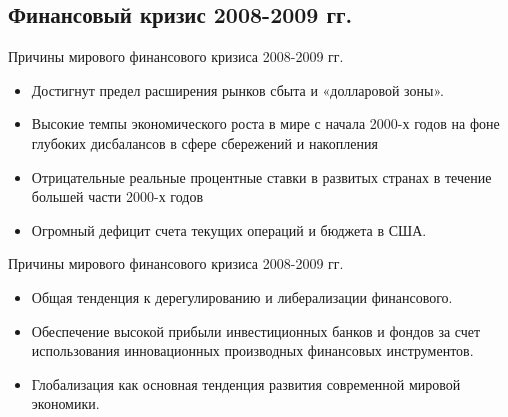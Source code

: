 \documentclass[_Banking_p1.tex]{subfiles}
\begin{document}
\subsection{Финансовый кризис 2008-2009 гг.}
\begin{frame}{\setfontsize{12pt} Причины мирового финансового кризиса 2008-2009 гг.}
\begin{itemize}[<+->]
\item
Достигнут предел расширения рынков сбыта и «долларовой зоны». 

\item
Высокие темпы экономического роста в мире с начала 2000-х годов на фоне глубоких дисбалансов в сфере  сбережений и накопления

\item
Отрицательные реальные процентные ставки в развитых странах в течение большей части 2000-х годов

\item
Огромный дефицит счета текущих операций и бюджета в США.
\end{itemize}

\end{frame}
\begin{frame}{\setfontsize{12pt}Причины мирового финансового кризиса 2008-2009 гг.}
\begin{itemize}[<+->]
\item
Общая тенденция к дерегулированию и либерализации финансового.

\item
Обеспечение высокой прибыли инвестиционных банков и фондов за счет использования инновационных производных финансовых инструментов.

\item
Глобализация как основная тенденция развития современной мировой экономики. 

\end{itemize}

\end{frame}
\end{document}
